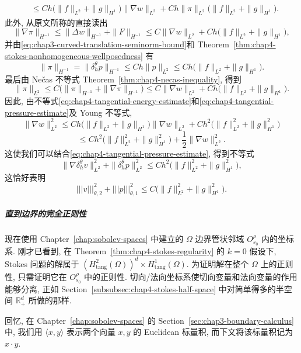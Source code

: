 \begin{Proof}
\begin{align}
 &\leq Ch\bigl(\|f\|_{L^2}+\|g\|_{H^1}\bigr)\|\nabla w\|_{L^2}
 +Ch\|\pi\|_{L^2}\bigl(\|f\|_{L^2}+\|g\|_{H^1}\bigr).
 \label{eq:chap4-tangential-energy-estimate}
\end{align}
此外, 从原文所称的直接读出
\[
 \|\nabla\pi\|_{H^{-1}}
 \leq\|\Delta w\|_{H^{-1}}+\|F\|_{H^{-1}}
 \leq C\|\nabla w\|_{L^2}+Ch\bigl(\|f\|_{L^2}+\|g\|_{H^1}\bigr),
\]
并由\eqref{eq:chap3-curved-translation-seminorm-bound}和 Theorem~\ref{thm:chap4-stokes-nonhomogeneous-wellposedness} 有
\[
 \|\pi\|_{H^{-1}}=\|\delta_h^\theta p\|_{H^{-1}}
 \leq Ch\|p\|_{L^2}
 \leq Ch\bigl(\|f\|_{L^2}+\|g\|_{H^1}\bigr).
\]
最后由 Nečas 不等式 Theorem~\ref{thm:chap4-necas-inequality}, 得到
\begin{equation}
 \|\pi\|_{L^2}
 \leq C\bigl(\|\pi\|_{H^{-1}}+\|\nabla\pi\|_{H^{-1}}\bigr)
 \leq C\|\nabla w\|_{L^2}+Ch\bigl(\|f\|_{L^2}+\|g\|_{H^1}\bigr).
 \label{eq:chap4-tangential-pressure-estimate}
\end{equation}
因此, 由不等式\eqref{eq:chap4-tangential-energy-estimate}和\eqref{eq:chap4-tangential-pressure-estimate}及 Young 不等式,
\[
 \|\nabla w\|_{L^2}^2
 \leq Ch\bigl(\|f\|_{L^2}+\|g\|_{H^1}\bigr)\|\nabla w\|_{L^2}
 +Ch^2\bigl(\|f\|_{L^2}^2+\|g\|_{H^1}^2\bigr)
\]
\[
 \leq Ch^2\bigl(\|f\|_{L^2}^2+\|g\|_{H^1}^2\bigr)
 +\frac12\|\nabla w\|_{L^2}^2.
\]
这使我们可以结合\eqref{eq:chap4-tangential-pressure-estimate}, 得到不等式
\[
 \|\nabla\delta_h^\theta v\|_{L^2}^2+\|\delta_h^\theta p\|_{L^2}^2
 \leq Ch^2\bigl(\|f\|_{L^2}^2+\|g\|_{H^1}^2\bigr),
\]
这恰好表明
\[
 |||v|||_{\theta,2}^2+|||p|||_{\theta,1}^2
 \leq C\bigl(\|f\|_{L^2}^2+\|g\|_{H^1}^2\bigr).
\]
\end{Proof}

\subparagraph{直到边界的完全正则性}
\label{subsubsec:chap4-stokes-complete-boundary-regularity}
\leavevmode\par

现在使用 Chapter~\ref{chap:sobolev-spaces} 中建立的 $\Omega$ 边界管状邻域 $O_{s_0}^\rho$ 内的坐标系. 刚才已看到, 在 Theorem~\ref{thm:chap4-stokes-regularity} 的 $k=0$ 假设下, Stokes 问题的解属于 $(H_{\mathrm{tang}}^2(\Omega))^d\times H_{\mathrm{tang}}^1(\Omega)$. 为证明解在整个 $\Omega$ 上的正则性, 只需证明它在 $O_{s_0}^\rho$ 中的正则性. 切向/法向坐标系使切向变量和法向变量的作用能够分离, 正如 Section~\ref{subsubsec:chap4-stokes-half-space} 中对简单得多的半空间 $\mathbb R_+^d$ 所做的那样.

回忆, 在 Chapter~\ref{chap:sobolev-spaces} 的 Section~\ref{sec:chap3-boundary-calculus} 中, 我们用 $\langle x,y\rangle$ 表示两个向量 $x,y$ 的 Euclidean 标量积, 而下文将该标量积记为 $x\cdot y$.

